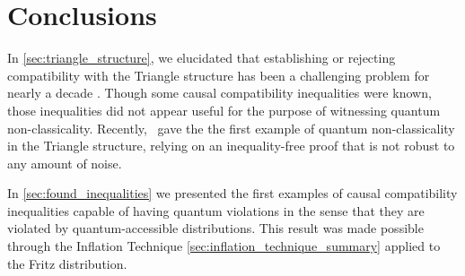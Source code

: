 \documentclass[aps, 10pt, english, twoside, pra, nofootinbib, tightenlines, longbibliography, superscriptaddress]{revtex4-1}
\begin{document}


    \section{Conclusions}
    \label{sec:conclusions}
    In \cref{sec:triangle_structure}, we elucidated that establishing or rejecting compatibility with the Triangle structure has been a challenging problem for nearly a decade \cite{Steudel_2010,Branciard_2012,Henson_2014,Fritz_2012,Gisin_2017}. Though some causal compatibility inequalities were known, those inequalities did not appear useful for the purpose of witnessing quantum non-classicality. Recently,~\citet{Fritz_2012} gave the the first example of quantum non-classicality in the Triangle structure, relying on an inequality-free proof that is not robust to any amount of noise.


    In \cref{sec:found_inequalities} we presented the first examples of causal compatibility inequalities capable of having quantum violations in the sense that they are violated by quantum-accessible distributions. This result was made possible through the Inflation Technique \cref{sec:inflation_technique_summary} applied to the Fritz distribution.
\end{document}
